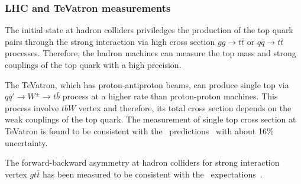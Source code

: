 \subsubsection{LHC and TeVatron measurements}
The initial state at hadron colliders priviledges the production of the top quark pairs through the strong interaction via high cross section $gg\to t\bar{t}$ or $q\bar{q}\to t\bar{t}$ processes.
Therefore, the hadron machines can measure the top mass and strong couplings of the top quark with a high precision. 

The TeVatron, which has proton-antiproton beams, can produce single top via $q\bar{q}' \to W^\pm \to t\bar{b}$ process at a higher rate than proton-proton machines. 
This process involve $tbW$ vertex and therefore, its total cross section depends on the weak couplings of the top quark. 
The measurement of single top cross section at TeVatron is found to be consistent with the \sm\ predictions~\cite{bib:TeVstop} with about 16\% uncertainty.

The forward-backward asymmetry at hadron colliders for strong interaction vertex $gt\bar{t}$ has been measured to be consistent with the \sm\ expectations~\cite{bib:TeVAfb}. 

